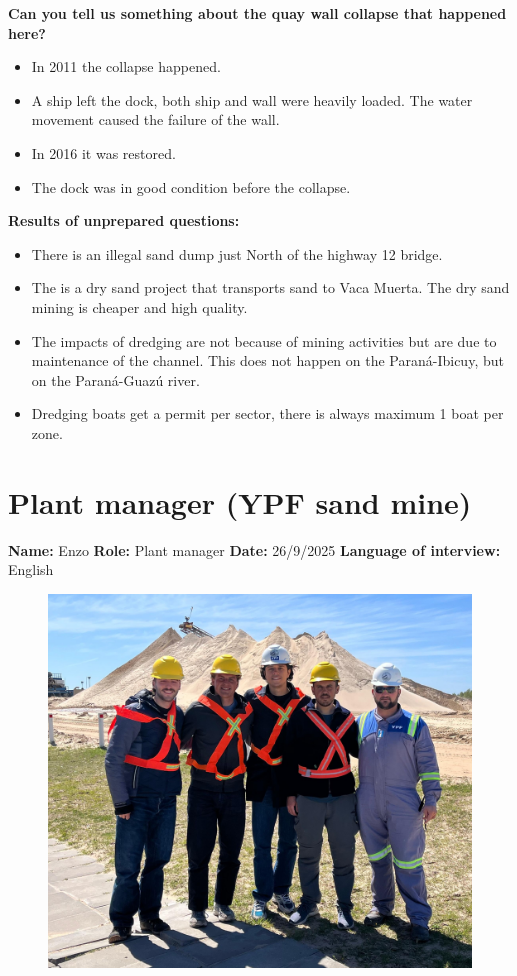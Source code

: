 \textbf{Can you tell us something about the quay wall collapse that happened here?}
\begin{itemize}
    \item In 2011 the collapse happened.
    \item A ship left the dock, both ship and wall were heavily loaded. The water movement caused the failure of the wall.
    \item In 2016 it was restored.
    \item The dock was in good condition before the collapse.
\end{itemize}

\textbf{Results of unprepared questions:}
\begin{itemize}
    \item There is an illegal sand dump just North of the highway 12 bridge.
    \item The is a dry sand project that transports sand to Vaca Muerta. The dry sand mining is cheaper and high quality.
    \item The impacts of dredging are not because of mining activities but are due to maintenance of the channel. This does not happen on the Paraná-Ibicuy, but on the Paraná-Guazú river.
    \item Dredging boats get a permit per sector, there is always maximum 1 boat per zone.
\end{itemize}

\section{Plant manager (YPF sand mine)}
\textbf{Name:} Enzo \newline
\textbf{Role:} Plant manager \newline
\textbf{Date:} 26/9/2025 \newline
\textbf{Language of interview:} English

\begin{figure}[H]
    \centering
    \includegraphics[width=0.4\linewidth]{figures/appendixE/InterviewYPF.jpeg}
\end{figure}

